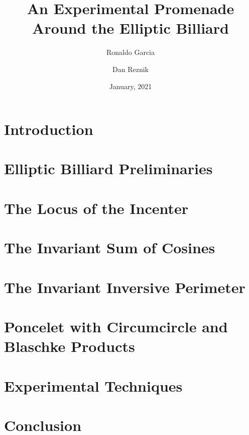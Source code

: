 \documentclass{amsbook}
\title[An Exp. Promenade around the Ell. Billiard]{An Experimental Promenade\\Around the Elliptic Billiard}
\author[R. Garcia]{Ronaldo Garcia}
\author[D. Reznik]{Dan Reznik}
\date{January, 2021}
\begin{document}
\maketitle

\chapter{Introduction}
\label{sec:intro}


\chapter{Elliptic Billiard Preliminaries}
\label{sec:preliminaries}


\chapter{The Locus of the Incenter}
\label{sec:loci}


\chapter{The Invariant Sum of Cosines}
\label{sec:cosines}


\chapter{The Invariant Inversive Perimeter}
\label{sec:inv-perimeter}


\chapter{Poncelet with Circumcircle and Blaschke Products}
\label{sec:circumcircle}


\chapter{Experimental Techniques}
\label{sec:experimental}


\chapter{Conclusion}
\label{sec:conclusion}




\appendix
\end{document}
